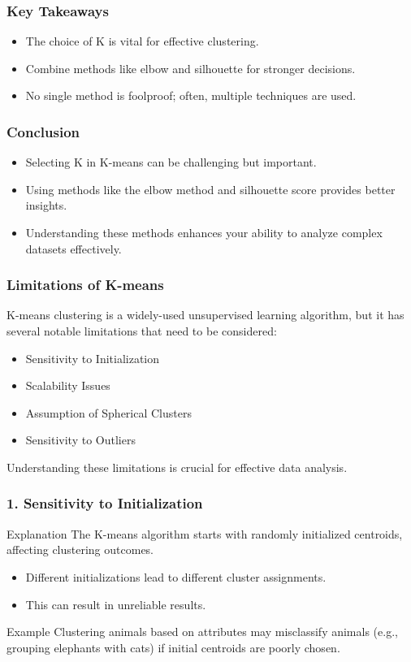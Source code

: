 \documentclass[aspectratio=169]{beamer}
\begin{document}
\begin{frame}[fragile]
    \frametitle{Key Takeaways}
    \begin{itemize}
        \item The choice of K is vital for effective clustering.
        \item Combine methods like elbow and silhouette for stronger decisions.
        \item No single method is foolproof; often, multiple techniques are used.
    \end{itemize}
\end{frame}

\begin{frame}[fragile]
    \frametitle{Conclusion}
    \begin{itemize}
        \item Selecting K in K-means can be challenging but important.
        \item Using methods like the elbow method and silhouette score provides better insights.
        \item Understanding these methods enhances your ability to analyze complex datasets effectively.
    \end{itemize}
\end{frame}

\begin{frame}[fragile]
    \frametitle{Limitations of K-means}
    K-means clustering is a widely-used unsupervised learning algorithm, but it has several notable limitations that need to be considered:
    \begin{itemize}
        \item Sensitivity to Initialization
        \item Scalability Issues
        \item Assumption of Spherical Clusters
        \item Sensitivity to Outliers
    \end{itemize}
    Understanding these limitations is crucial for effective data analysis.
\end{frame}

\begin{frame}[fragile]
    \frametitle{1. Sensitivity to Initialization}
    \begin{block}{Explanation}
        The K-means algorithm starts with randomly initialized centroids, affecting clustering outcomes.
    \end{block}
    \begin{itemize}
        \item Different initializations lead to different cluster assignments.
        \item This can result in unreliable results.
    \end{itemize}
    \begin{block}{Example}
        Clustering animals based on attributes may misclassify animals (e.g., grouping elephants with cats) if initial centroids are poorly chosen.
    \end{block}
\end{frame}
\end{document}
